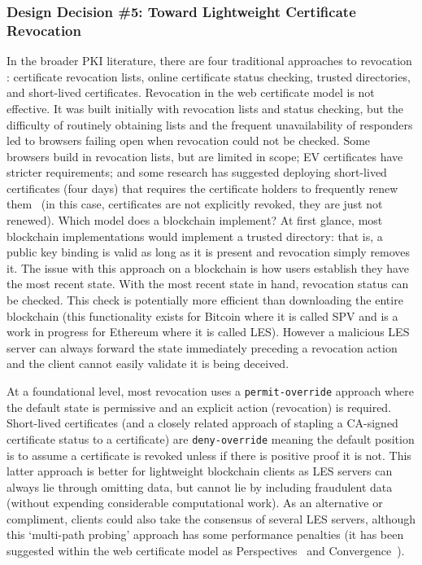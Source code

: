 \subsubsection[Toward Lightweight Certificate Revocation]{Design Decision \#5: Toward Lightweight Certificate Revocation}\label{LESservers}

In the broader PKI literature, there are four traditional approaches to revocation \cite{myers1998revocatoin}: certificate revocation lists, online certificate status checking, trusted directories, and short-lived certificates. Revocation in the web certificate model is not effective. It was built initially with revocation lists and status checking, but the difficulty of routinely obtaining lists and the frequent unavailability of responders led to browsers failing open when revocation could not be checked. Some browsers build in revocation lists, but are limited in scope; EV certificates have stricter requirements; and some research has suggested deploying short-lived certificates (\eg four days) that requires the certificate holders to frequently renew them~\cite{topalovic2012towards} (in this case, certificates are not explicitly revoked, they are just not renewed). Which model does a blockchain implement? At first glance, most blockchain implementations would implement a trusted directory: that is, a public key binding is valid as long as it is present and revocation simply removes it. The issue with this approach on a blockchain is how users establish they have the most recent state. With the most recent state in hand, revocation status can be checked. This check is potentially more efficient than downloading the entire blockchain (this functionality exists for Bitcoin where it is called SPV and is a work in progress for Ethereum where it is called LES). However a malicious LES server can always forward the state immediately preceding a revocation action and the client cannot easily validate it is being deceived.

At a foundational level, most revocation uses a \texttt{permit-override} approach where the default state is permissive and an explicit action (revocation) is required. Short-lived certificates (and a closely related approach of stapling a CA-signed certificate status to a certificate) are \texttt{deny-override} meaning the default position is to assume a certificate is revoked unless if there is positive proof it is not. This latter approach is better for lightweight blockchain clients as LES servers can always lie through omitting data, but cannot lie by including fraudulent data (without expending considerable computational work). As an alternative or compliment, clients could also take the consensus of several LES servers, although this `multi-path probing' approach has some performance penalties (it has been suggested within the web certificate model as Perspectives~\cite{WAP08} and Convergence~\cite{Mar11}). 

